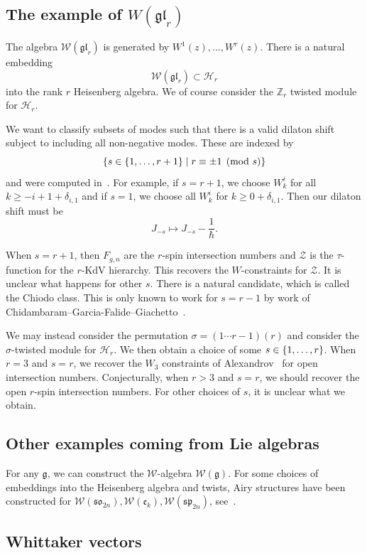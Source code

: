 \documentclass[leqno, openany]{memoir}
\theoremstyle{definition}
\theoremstyle{remark}
\theoremstyle{plain}
\theoremstyle{definition}
\theoremstyle{remark}
\newcommand{\Z}{\mathbb{Z}}
\newcommand{\g}{\mathfrak{g}}
\newcommand{\mc}[1]{\mathcal{#1}}
\newcommand{\mf}[1]{\mathfrak{#1}}
\begin{document}
\subsection{The example of $W(\mf{gl}_r)$}

The algebra $\mc{W}(\mf{gl}_r)$ is generated by $W^1(z), \ldots, W^r(z)$. There is a natural embedding
\[ \mc{W}(\mf{gl}_r) \subset \mc{H}_r \]
into the rank $r$ Heisenberg algebra. We of course consider the $\Z_r$ twisted module for $\mc{H}_r$. 

We want to classify subsets of modes such that there is a valid dilaton shift subject to including all non-negative modes. These are indexed by
\[ \qty{s \in \qty{1, \ldots, r+1} \mid r \equiv \pm 1 \pmod{s}} \]
and were computed in~\cite{airywliealg}.
For example, if $s = r+1$, we choose $W_k^i$ for all $k \geq -i + 1 + \delta_{i, 1}$ and if $s = 1$, we choose all $W_k^i$ for $k \geq 0 + \delta_{i,1}$. Then our dilaton shift must be
\[ J_{-s} \mapsto J_{-s} - \frac{1}{\hslash}. \]

When $s = r+1$, then $F_{g, n}$ are the $r$-spin intersection numbers and $\mc{Z}$ is the $\tau$-function for the $r$-KdV hierarchy. This recovers the $W$-constraints for $\mc{Z}$. It is unclear what happens for other $s$. There is a natural candidate, which is called the Chiodo class. This is only known to work for $s=r-1$ by work of Chidambaram--Garcia-Falide--Giachetto~\cite{negrspin}.

We may instead consider the permutation $\sigma = (1 \cdots r-1)(r)$ and consider the $\sigma$-twisted module for $\mc{H}_r$. We then obtain a choice of some $s \in \qty{1, \ldots, r}$. When $r=3$ and $s=r$, we recover the $W_3$ constraints of Alexandrov~\cite{openintnumber} for open intersection numbers. Conjecturally, when $r > 3$ and $s = r$, we should recover the open $r$-spin intersection numbers. For other choices of $s$, it is unclear what we obtain.

\subsection{Other examples coming from Lie algebras}

For any $\mf{g}$, we can construct the $\mc{W}$-algebra $\mc{W}(\g)$. For some choices of embeddings into the Heisenberg algebra and twists, Airy structures have been constructed for $\mc{W}(\mf{so}_{2n}), \mc{W}(\mf{e}_k), \mc{W}(\mf{sp}_{2n})$, see~\cites{airywliealg}{airysp2n}.

\subsection{Whittaker vectors}
\end{document}
